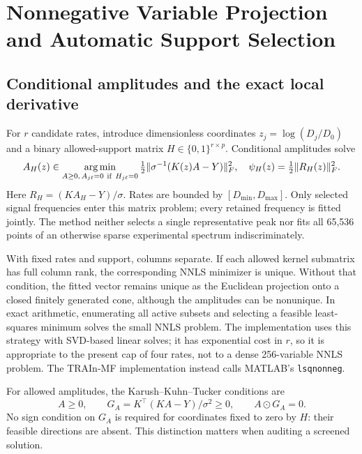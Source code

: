 \section{Nonnegative Variable Projection and Automatic Support Selection}\label{sec:algorithm}
\subsection{Conditional amplitudes and the exact local derivative}
For $r$ candidate rates, introduce dimensionless coordinates $z_j=\log(D_j/D_0)$ and a binary allowed-support matrix $H\in\{0,1\}^{r\times p}$. Conditional amplitudes solve
\begin{equation}\label{eq:nnls}
 A_H(z)\in\operatorname*{arg\,min}_{A\geq0,\,A_{j\ell}=0\ \mathrm{if}\ H_{j\ell}=0}
 \tfrac12\|\sigma^{-1}(K(z)A-Y)\|_F^2,
 \quad \psi_H(z)=\tfrac12\|R_H(z)\|_F^2.
\end{equation}
Here $R_H=(KA_H-Y)/\sigma$. Rates are bounded by $[D_{\min},D_{\max}]$. Only selected signal frequencies enter this matrix problem; every retained frequency is fitted jointly. The method neither selects a single representative peak nor fits all 65,536 points of an otherwise sparse experimental spectrum indiscriminately.

With fixed rates and support, columns separate. If each allowed kernel submatrix has full column rank, the corresponding NNLS minimizer is unique. Without that condition, the fitted vector remains unique as the Euclidean projection onto a closed finitely generated cone, although the amplitudes can be nonunique. In exact arithmetic, enumerating all active subsets and selecting a feasible least-squares minimum solves the small NNLS problem. The implementation uses this strategy with SVD-based linear solves; it has exponential cost in $r$, so it is appropriate to the present cap of four rates, not to a dense 256-variable NNLS problem. The TRAIn-MF implementation instead calls MATLAB's \texttt{lsqnonneg}.

For allowed amplitudes, the Karush--Kuhn--Tucker conditions are
\begin{equation}\label{eq:kkt}
 A\geq0,\qquad G_A=K^\top(KA-Y)/\sigma^2\geq0,\qquad A\odot G_A=0.
\end{equation}
No sign condition on $G_A$ is required for coordinates fixed to zero by $H$: their feasible directions are absent. This distinction matters when auditing a screened solution.

